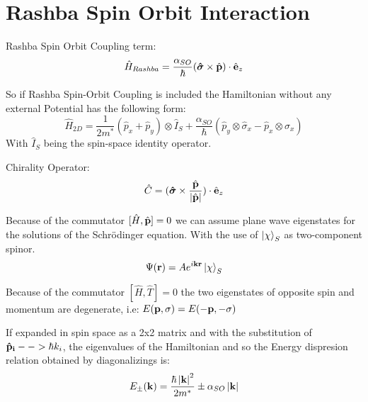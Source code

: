 
\author{Jonas Siegl}



\section{Rashba Spin Orbit Interaction}
Rashba Spin Orbit Coupling term:
\begin{equation}
	\hat{H}_{Rashba} = \frac{\alpha_{SO}}{\hbar} (\mbox{\boldmath$ \hat{\sigma} $} \times \hat{\mathbf{p}}) \cdot \hat{\mathbf{e}}_{z}
	\label{rashbacouple}
\end{equation}

So if Rashba Spin-Orbit Coupling is included the Hamiltonian without any external Potential has the following form:
\begin{equation}
	\hat{H}_{2D} = \frac{1}{2m^*}(\hat{p}_{x}+\hat{p}_{y}) \otimes \hat{I}_{S} + \frac{\alpha_{SO}}{\hbar}(\hat{p}_{y} \otimes \hat{\sigma}_{x} - \hat{p}_{x} \otimes \hat{\sigma}_{x})
	\label{rashbahamiltonian}
\end{equation}
With $\hat{I}_{S}$ being the spin-space identity operator.

Chirality Operator:
\begin{equation}
	\hat{C} = (\mbox{\boldmath$ \hat{\sigma} $} \times \frac{\hat{\mathbf{p}}}{|\hat{\mathbf{p}}|}) \cdot \hat{\mathbf{e}}_{z}
	\label{chirality}
\end{equation}

Because of the commutator $[\hat{H},\hat{\mathbf{p}}]=0$ we can assume plane wave eigenstates for the solutions of the Schr\"odinger equation. With the use of $\left| \chi \right>_{S}$ as two-component spinor.
\begin{equation}
	\Psi(\mathbf{r}) = A e^{i \mathbf{k} \mathbf{r}} \left| \chi \right>_{S}
	\label{planewaveeigenstate}
\end{equation}

Because of the commutator $[\hat{H},\hat{T}]=0$ the two eigenstates of opposite spin and momentum are degenerate, i.e: $E(\mathbf{p},\sigma) = E(-\mathbf{p},-\sigma)$

If expanded in spin space as a 2x2 matrix and with the substitution of $\mathbf{\hat{p}_{i}} --> \hbar k_{i}$, the eigenvalues of the Hamiltonian and so the Energy dispresion relation obtained by diagonalizings is:
\begin{equation}
	E_{\pm}(\mathbf{k}) = \frac{\hbar \left| \mathbf{k} \right|^2}{2m^*} \pm \alpha_{SO} \left| \mathbf{k} \right|	
	\label{2degdispersion}
\end{equation}

